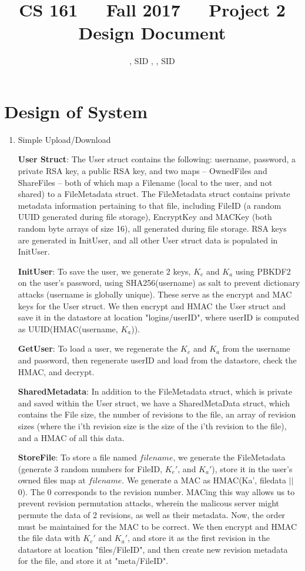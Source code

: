\documentclass[11pt]{article}
\title{CS 161\ \ \ Fall 2017\ \ \ Project 2 Design Document}
\author{\NameA, SID \SIDA, \NameB, SID \SIDB}
\date{}
\begin{document}
\maketitle

\section{Design of System}
\begin{enumerate}
\item{Simple Upload/Download}

\textbf{User Struct}: The User struct contains the following: username, password, a private RSA key, a public RSA key, and two maps -- OwnedFiles and ShareFiles -- both of which map a Filename (local to the user, and not shared) to a FileMetadata struct. The FileMetadata struct contains private metadata information pertaining to that file, including FileID (a random UUID generated during file storage), EncryptKey and MACKey (both random byte arrays of size 16), all generated during file storage. RSA keys are generated in InitUser, and all other User struct data is populated in InitUser.

\textbf{InitUser}: To save the user, we generate 2 keys, $K_e$ and $K_a$ using PBKDF2 on the user's password, using SHA256(username) as salt to prevent dictionary attacks (username is globally unique). These serve as the encrypt and MAC keys for the User struct. We then encrypt and HMAC the User struct and save it in the datastore at location "logins/userID", where userID is computed as UUID(HMAC(username, $K_a$)).

\textbf{GetUser}: To load a user, we regenerate the $K_e$ and $K_a$ from the username and password, then regenerate userID and load from the datastore, check the HMAC, and decrypt.

\textbf{SharedMetadata}: In addition to the FileMetadata struct, which is private and saved within the User struct, we have a SharedMetaData struct, which contains the File size, the number of revisions to the file, an array of revision sizes (where the i'th revision size is the size of the i'th revision to the file), and a HMAC of all this data.

\textbf{StoreFile}: To store a file named $filename$, we generate the FileMetadata (generate 3 random numbers for FileID, $K_e'$, and $K_a'$), store it in the user's owned files map at $filename$. We generate a MAC as HMAC(Ka', filedata $||$\ $0$). The $0$ corresponds to the revision number. MACing this way allows us to prevent revision permutation attacks, wherein the malicous server might permute the data of 2 revisions, as well as their metadata. Now, the order must be maintained for the MAC to be correct. We then encrypt and HMAC the file data with $K_e'$ and $K_a'$, and store it as the first revision in the datastore at location "files/FileID", and then create new revision metadata for the file, and store it at "meta/FileID".


\end{enumerate}
\end{document}
